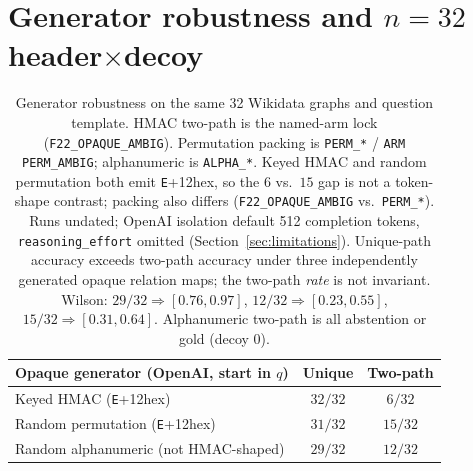 \documentclass[10pt]{article} %
\begin{document}
\section{Generator robustness and $n{=}32$ header$\times$decoy}
\label{app:tokens}

\begin{table}[h]
\centering
\small

\caption{Generator robustness on the same 32 Wikidata graphs and question
template. HMAC two-path is the named-arm lock
(\texttt{F22\_OPAQUE\_AMBIG}). Permutation packing is \texttt{PERM\_*} /
\texttt{ARM PERM\_AMBIG}; alphanumeric is \texttt{ALPHA\_*}.
Keyed HMAC and random permutation both emit \texttt{E}+12hex, so the $6$
vs.\ $15$ gap is not a token-shape contrast; packing also differs
(\texttt{F22\_OPAQUE\_AMBIG} vs.\ \texttt{PERM\_*}). Runs undated;
OpenAI isolation default 512 completion tokens,
\texttt{reasoning\_effort} omitted
(Section~\ref{sec:limitations}).
Unique-path accuracy exceeds two-path accuracy under three independently
generated opaque relation maps; the two-path \emph{rate} is not invariant.
Wilson: $29/32 \Rightarrow [0.76,0.97]$,
$12/32 \Rightarrow [0.23,0.55]$,
$15/32 \Rightarrow [0.31,0.64]$. Alphanumeric two-path is all abstention or
gold (decoy $0$).}
\label{tab:tokens}
\begin{tabular}{@{}lcc@{}}
\toprule
Opaque generator (OpenAI, start in $q$) & Unique & Two-path \\
\midrule
Keyed HMAC (\texttt{E}+12hex) & $32/32$ & $6/32$ \\
Random permutation (\texttt{E}+12hex) & $31/32$ & $15/32$ \\
Random alphanumeric (not HMAC-shaped) & $29/32$ & $12/32$ \\
\bottomrule
\end{tabular}

\end{table}
\end{document}
